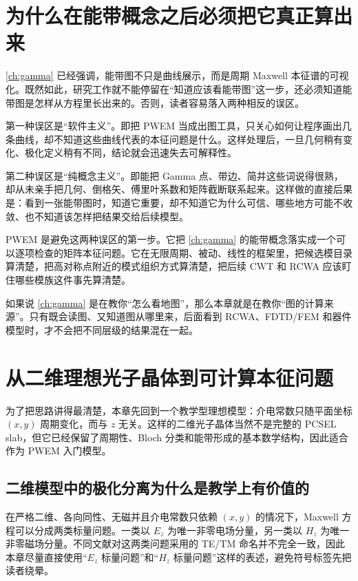 \section{为什么在能带概念之后必须把它真正算出来}
\cref{ch:gamma} 已经强调，能带图不只是曲线展示，而是周期 Maxwell 本征谱的可视化。既然如此，研究工作就不能停留在“知道应该看能带图”这一步，还必须知道能带图是怎样从方程里长出来的。否则，读者容易落入两种相反的误区。

第一种误区是“软件主义”。即把 PWEM 当成出图工具，只关心如何让程序画出几条曲线，却不知道这些曲线代表的本征问题是什么。这样处理后，一旦几何稍有变化、极化定义稍有不同，结论就会迅速失去可解释性。

第二种误区是“纯概念主义”。即能把 Gamma 点、带边、简并这些词说得很熟，却从未亲手把几何、倒格矢、傅里叶系数和矩阵截断联系起来。这样做的直接后果是：看到一张能带图时，知道它重要，却不知道它为什么可信、哪些地方可能不收敛、也不知道该怎样把结果交给后续模型。

PWEM 是避免这两种误区的第一步。它把 \cref{ch:gamma} 的能带概念落实成一个可以逐项检查的矩阵本征问题。它在无限周期、被动、线性的框架里，把候选模目录算清楚，把高对称点附近的模式组织方式算清楚，把后续 CWT 和 RCWA 应该盯住哪些模族这件事先算清楚。

\begin{IntuitionBox}
如果说 \cref{ch:gamma} 是在教你“怎么看地图”，那么本章就是在教你“图的计算来源”。只有既会读图、又知道图从哪里来，后面看到 RCWA、FDTD/FEM 和器件模型时，才不会把不同层级的结果混在一起。
\end{IntuitionBox}

\section{从二维理想光子晶体到可计算本征问题}
为了把思路讲得最清楚，本章先回到一个教学型理想模型：介电常数只随平面坐标 $(x,y)$ 周期变化，而与 $z$ 无关。这样的二维光子晶体当然不是完整的 PCSEL slab，但它已经保留了周期性、Bloch 分类和能带形成的基本数学结构，因此适合作为 PWEM 入门模型。

\subsection{二维模型中的极化分离为什么是教学上有价值的}
在严格二维、各向同性、无磁并且介电常数只依赖 $(x,y)$ 的情况下，Maxwell 方程可以分成两类标量问题。一类以 $E_z$ 为唯一非零电场分量，另一类以 $H_z$ 为唯一非零磁场分量。不同文献对这两类问题采用的 TE/TM 命名并不完全一致，因此本章尽量直接使用“$E_z$ 标量问题”和“$H_z$ 标量问题”这样的表述，避免符号标签先把读者绕晕。

